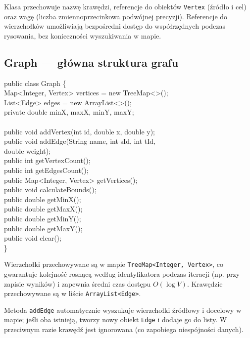 \documentclass[a4paper, 11pt]{article}
\begin{document}
Klasa przechowuje nazwę krawędzi, referencje do obiektów \texttt{Vertex}
(źródło i cel) oraz wagę (liczba zmiennoprzecinkowa podwójnej precyzji).
Referencje do wierzchołków umożliwiają bezpośredni dostęp do współrzędnych
podczas rysowania, bez konieczności wyszukiwania w mapie.

\subsection{Graph --- główna struktura grafu}

\begin{filebox}
public class Graph \{\\
\quad Map<Integer, Vertex> vertices = new TreeMap<>();\\
\quad List<Edge> edges = new ArrayList<>();\\
\quad private double minX, maxX, minY, maxY;\\
\\
\quad public void addVertex(int id, double x, double y);\\
\quad public void addEdge(String name, int sId, int tId,\\
\quad \qquad\qquad\qquad\quad\;\; double weight);\\
\quad public int getVertexCount();\\
\quad public int getEdgesCount();\\
\quad public Map<Integer, Vertex> getVertices();\\
\quad public void calculateBounds();\\
\quad public double getMinX();\\
\quad public double getMaxX();\\
\quad public double getMinY();\\
\quad public double getMaxY();\\
\quad public void clear();\\
\}
\end{filebox}

Wierzchołki przechowywane są w mapie \texttt{TreeMap<Integer, Vertex>},
co gwarantuje kolejność rosnącą według identyfikatora podczas iteracji
(np. przy zapisie wyników) i zapewnia średni czas dostępu $O(\log V)$.
Krawędzie przechowywane są w liście \texttt{ArrayList<Edge>}.

Metoda \texttt{addEdge} automatycznie wyszukuje wierzchołki źródłowy
i docelowy w mapie; jeśli oba istnieją, tworzy nowy obiekt \texttt{Edge}
i dodaje go do listy. W przeciwnym razie krawędź jest ignorowana
(co zapobiega niespójności danych).
\end{document}
